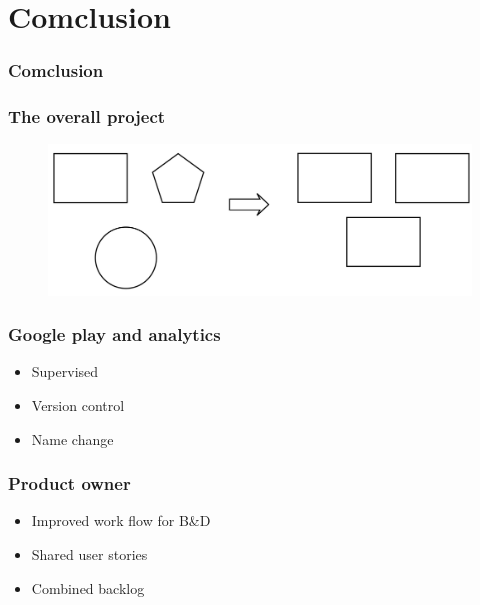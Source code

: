 \section{Comclusion}
\begin{frame}
	\frametitle{Comclusion}
\end{frame}

\begin{frame}
	\frametitle{The overall project}
	\begin{figure}[H]
		\centering
		\includegraphics[width= 0.8 \textwidth]{pictures/SameGUIDesign.png}
	\end{figure}
\end{frame}

\begin{frame}
	\frametitle{Google play and analytics}
	\begin{itemize}
		\item Supervised
		\item Version control
		\item Name change
	\end{itemize}
\end{frame}


\begin{frame}
	\frametitle{Product owner}
	\begin{itemize}
		\item Improved work flow for B\&D
		\item Shared user stories
		\item Combined backlog
	\end{itemize}
\end{frame}



